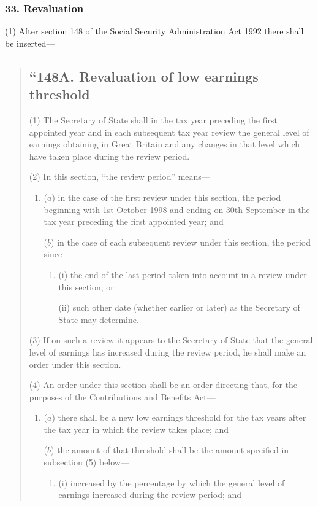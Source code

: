 \documentclass[12pt,a4paper]{article}
\begin{document}
\subsubsection{33. Revaluation}

(1) After section 148 of the Social Security Administration Act 1992 there shall be inserted—
\begin{quotation}
\subsection*{“148A. Revaluation of low earnings threshold}

(1) The Secretary of State shall in the tax year preceding the first appointed year and in each subsequent tax year review the general level of earnings obtaining in Great Britain and any changes in that level which have taken place during the review period.

(2) In this section, “the review period” means—
\begin{enumerate}\item[]
($a$) in the case of the first review under this section, the period beginning with 1st October 1998 and ending on 30th September in the tax year preceding the first appointed year; and

($b$) in the case of each subsequent review under this section, the period since—
\begin{enumerate}\item[]
(i) the end of the last period taken into account in a review under this section; or

(ii) such other date (whether earlier or later) as the Secretary of State may determine.
\end{enumerate}
\end{enumerate}

(3) If on such a review it appears to the Secretary of State that the general level of earnings has increased during the review period, he shall make an order under this section.

(4) An order under this section shall be an order directing that, for the purposes of the Contributions and Benefits Act—
\begin{enumerate}\item[]
($a$) there shall be a new low earnings threshold for the tax years after the tax year in which the review takes place; and

($b$) the amount of that threshold shall be the amount specified in subsection (5)  below—
\begin{enumerate}\item[]
(i) increased by the percentage by which the general level of earnings increased during the review period; and


\end{enumerate}
\end{enumerate}
\end{quotation}
\end{document}
